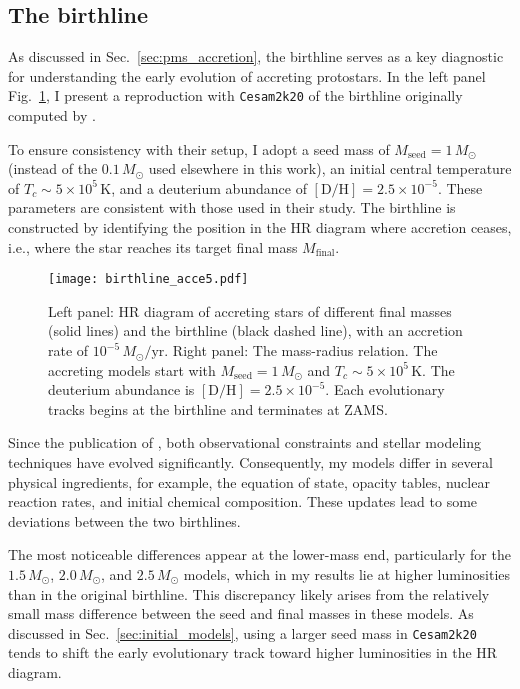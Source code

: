 \documentclass[12pt,a4paper]{article}
\newcommand{\mr}{\mathrm}
\begin{document}
\subsection{The birthline}
\label{sec:comp_palla_stahler}

As discussed in Sec.~\ref{sec:pms_accretion}, the birthline serves as a key diagnostic for understanding the early evolution of accreting protostars. In the left panel Fig.~\ref{fig:birthline_acce5}, I present a reproduction with \texttt{Cesam2k20} of the birthline originally computed by \textcite{PallaStahler1993}.

To ensure consistency with their setup, I adopt a seed mass of $M_\mr{seed} = 1\,M_\odot$ (instead of the $0.1\,M_\odot$ used elsewhere in this work), an initial central temperature of $T_c \sim 5 \times 10^5\,\mr{K}$, and a deuterium abundance of $[\mr{D/H}] = 2.5 \times 10^{-5}$. These parameters are consistent with those used in their study. The birthline is constructed by identifying the position in the HR diagram where accretion ceases, i.e., where the star reaches its target final mass $M_\mr{final}$.

\begin{figure}
  \centering  
  \texttt{[image: birthline\_acce5.pdf]}
  \caption{Left panel: HR diagram of accreting stars of different final masses (solid lines) and the birthline (black dashed line), with an accretion rate of $10^{-5}\,M_\odot/\mr{yr}$. Right panel: The mass-radius relation. The accreting models start with $M_\mr{seed} = 1\,M_\odot$ and $T_c \sim 5 \times 10^5\,\mr{K}$. The deuterium abundance is $[\mr{D/H}] = 2.5 \times 10^{-5}$. Each evolutionary tracks begins at the birthline and terminates at ZAMS.} \label{fig:birthline_acce5}
\end{figure}

Since the publication of \textcite{PallaStahler1993}, both observational constraints and stellar modeling techniques have evolved significantly. Consequently, my models differ in several physical ingredients, for example, the equation of state, opacity tables, nuclear reaction rates, and initial chemical composition. These updates lead to some deviations between the two birthlines.

The most noticeable differences appear at the lower-mass end, particularly for the $1.5\,M_\odot$, $2.0\,M_\odot$, and $2.5\,M_\odot$ models, which in my results lie at higher luminosities than in the original \textcite{PallaStahler1993} birthline. This discrepancy likely arises from the relatively small mass difference between the seed and final masses in these models. As discussed in Sec.~\ref{sec:initial_models}, using a larger seed mass in \texttt{Cesam2k20} tends to shift the early evolutionary track toward higher luminosities in the HR diagram.
\end{document}
